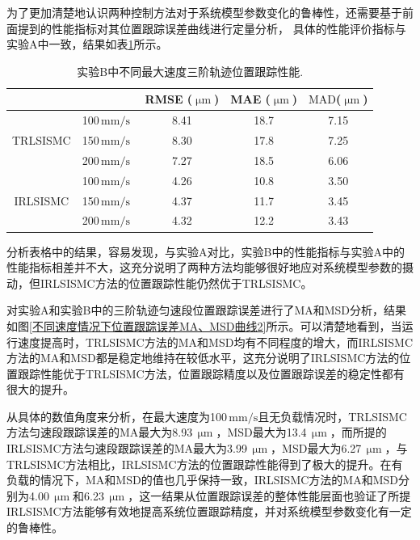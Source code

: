 为了更加清楚地认识两种控制方法对于系统模型参数变化的鲁棒性，还需要基于前面提到的性能指标对其位置跟踪误差曲线进行定量分析，
具体的性能评价指标与实验A中一致，结果如表\ref{实验B2}所示。
\begin{table}[H]
	\caption{实验B中不同最大速度三阶轨迹位置跟踪性能.}
	\label{实验B2}
	\centering
	\setlength{\tabcolsep}{3mm} 
	\begin{tabular}{ccccc}
		\toprule[1.5pt]
		& \text{参考轨迹} & RMSE ($\text{$\upmu$m}$) & MAE ($\text{$\upmu$m}$) & $\text{MAD}$($\text{$\upmu$m}$)   \\ 
		\midrule
		\multirow{3}{*}{TRLSISMC}     
		& 100\,$\text{mm/s }$        & 8.41      & 18.7 &7.15   \\  
		& 150\,$\text{mm/s }$        & 8.30      & 17.8 &7.25     \\ 
		& 200\,$\text{mm/s }$        & 7.27      & 18.5 &6.06     \\
		\midrule
		\multirow{3}{*}{IRLSISMC} 
		& 100\,$\text{mm/s }$       & 4.26      & 10.8 &3.50  \\  
		& 150\,$\text{mm/s }$       & 4.37      & 11.7 &3.45     \\ 
		& 200\,$\text{mm/s }$       & 4.32      & 12.2 &3.43     \\
		\bottomrule[1.5pt]
	\end{tabular}
\end{table}



分析表格中的结果，容易发现，与实验A对比，实验B中的性能指标与实验A中的性能指标相差并不大，这充分说明了两种方法均能够很好地应对系统模型参数的摄动，但IRLSISMC方法的位置跟踪性能仍然优于TRLSISMC。

对实验A和实验B中的三阶轨迹匀速段位置跟踪误差进行了MA和MSD分析，结果如图\ref{不同速度情况下位置跟踪误差MA、MSD曲线2}所示。可以清楚地看到，当运行速度提高时，TRLSISMC方法的MA和MSD均有不同程度的增大，而IRLSISMC方法的MA和MSD都是稳定地维持在较低水平，这充分说明了IRLSISMC方法的位置跟踪性能优于TRLSISMC方法，位置跟踪精度以及位置跟踪误差的稳定性都有很大的提升。

从具体的数值角度来分析，在最大速度为100\,$\text{mm/s}$且无负载情况时，TRLSISMC方法匀速段跟踪误差的MA最大为8.93\,$\text{$\upmu$m}$，MSD最大为13.4\,$\text{$\upmu$m}$，而所提的IRLSISMC方法匀速段跟踪误差的MA最大为3.99\,$\text{$\upmu$m}$，MSD最大为6.27\,$\text{$\upmu$m}$，与TRLSISMC方法相比，IRLSISMC方法的位置跟踪性能得到了极大的提升。在有负载的情况下，MA和MSD的值也几乎保持一致，IRLSISMC方法的MA和MSD分别为4.00\,$\text{$\upmu$m}$和6.23\,$\text{$\upmu$m}$，这一结果从位置跟踪误差的整体性能层面也验证了所提IRLSISMC方法能够有效地提高系统位置跟踪精度，并对系统模型参数变化有一定的鲁棒性。

